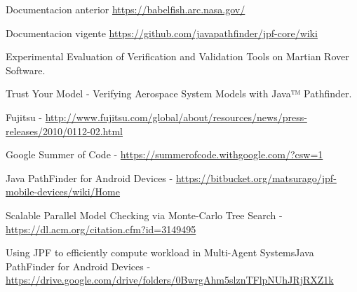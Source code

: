 \documentclass[runningheads]{llncs}
\begin{document}
%
%
%
% 
% 
%
\begin{thebibliography}{8}
Documentacion anterior \url{https://babelfish.arc.nasa.gov/}

Documentacion vigente \url{https://github.com/javapathfinder/jpf-core/wiki}

Experimental Evaluation of Verification and Validation Tools on Martian Rover Software.

Trust Your Model - Verifying Aerospace System Models with Java™ Pathfinder.

Fujitsu - \url{http://www.fujitsu.com/global/about/resources/news/press-releases/2010/0112-02.html}

Google Summer of Code - \url{https://summerofcode.withgoogle.com/?csw=1}

Java PathFinder for Android Devices - \url{https://bitbucket.org/matsurago/jpf-mobile-devices/wiki/Home}

Scalable Parallel Model Checking via Monte-Carlo Tree Search - \url{https://dl.acm.org/citation.cfm?id=3149495}

Using JPF to efficiently compute workload in Multi-Agent SystemsJava PathFinder for Android Devices - \url{https://drive.google.com/drive/folders/0BwrgAhm5slznTFlpNUhJRjRXZ1k}

\end{thebibliography}
\end{document}
